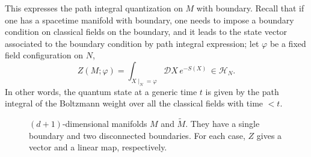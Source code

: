 This expresses the path integral quantization on $M$ with boundary.
Recall that if one has a spacetime manifold with boundary, one needs
to impose a boundary condition on classical fields on the boundary, and it leads
to the state vector associated to the boundary condition by path integral
expression; let $\varphi$ be a fixed field configuration on
$N$,
\begin{equation}
  Z(M;\varphi)  =  \int_{X\mid_{N}=\varphi}\mathcal{D}X \, e^{-S(X)} \,  \in  \mathcal{H}_{N}.
\end{equation}
In other words, the quantum state at a generic time $t$ is given
by the path integral of the Boltzmann weight over all the classical
fields with time $<t$.


\begin{figure}
\centering
  \subfloat[\label{}]{  %
    \begin{tikzpicture}[scale=1] %
        \def\bdyradius{0.8cm}

        \draw[thick] (0,-\bdyradius) arc[start angle=-90,end angle=90,x radius=1.8cm,y radius=\bdyradius] node[left=0.3,pos=0.5] {$M$};
        \draw[very thick, red!50] (0,0) node[black] {$N$} circle[x radius=0.4cm,y radius=\bdyradius] node[above=\bdyradius+0.1cm, black] {\normalsize$\mathcal{H}_N$};

    \end{tikzpicture}
  }
\qquad\qquad
  \subfloat[\label{}]{  %
    \begin{tikzpicture}[scale=1] %
        \def\bdyradius{1cm}

        \draw[thick] (0,-\bdyradius) to[out=0,in=180] (1.4cm,0.3cm-\bdyradius) to[out=0,in=180] (4cm,0.2cm-\bdyradius*1.2);
        \draw[thick] (0,\bdyradius) to[out=0,in=180] (2.2cm,-0.2cm+\bdyradius) to[out=0,in=180] (4cm,0.2cm+\bdyradius*1.2);

        \draw[very thick, red!50] (0,0) node[black] {$-N_1$} circle[x radius=0.4cm,y radius=\bdyradius];
        \draw[very thick, red!50] (4,0.2) node[black] {$N_2$} circle[x radius=0.4cm,y radius=\bdyradius*1.2];

        \node at (2,0) {\small$\tilde M$};

    \end{tikzpicture}
  }
  \caption{$(d+1)$-dimensional manifolds $M$ and $\tilde{M}$.
  They have a single boundary and two disconnected boundaries.
  For each case, $Z$ gives a vector and a linear map, respectively.}
  \label{fig:mfd_w_bdys}
\end{figure}


